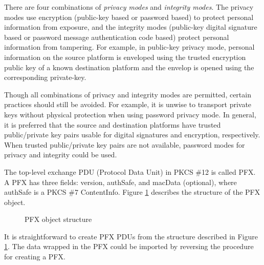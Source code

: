 \documentclass{article}
\begin{document}
There are four combinations of {\em privacy modes} and {\em integrity modes}.
The privacy modes use encryption (public-key based or password based) to 
protect personal information from exposure, and the integrity modes 
(public-key digital signature based or password message authentication
code based) protect personal information from tampering. 
For example, in public-key privacy mode, personal information on the source
platform is enveloped using the trusted encryption public key of 
a known destination platform and the envelop is opened using the 
corresponding private-key.

Though all combinations of privacy and integrity modes are permitted,
certain practices should still be avoided. For example, it is unwise
to transport private keys without physical protection when using
password privacy mode. In general, 
it is preferred that the source and destination platforms 
have trusted public/private key pairs usable for 
digital signatures and encryption, respectively.
When trusted public/private key pairs are not available, 
password modes for privacy and integrity could be used.

The top-level exchange PDU (Protocol Data Unit) in PKCS \#12
is called PFX. A PFX has three fields: {version, authSafe},
and {macData} (optional), where {authSafe} is a PKCS \#7 
{ContentInfo}. Figure \ref{pkcs12structure} describes the
structure of the PFX object.
\begin{center}
\begin{figure}[htb]
\caption{PFX object structure}
\label{pkcs12structure}
\end{figure}
\end{center}
It is straightforward to create PFX PDUs from the structure
described in Figure \ref{pkcs12structure}. 
The data wrapped in the PFX could be imported by reversing 
the procedure for creating a PFX. 
\end{document}
